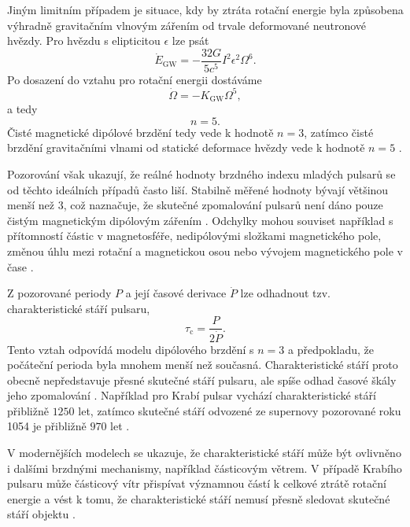 \documentclass[%
final%
,htext%
]{ipothes}
\begin{document}
Jiným limitním případem je situace, kdy by ztráta rotační energie byla způsobena výhradně gravitačním vlnovým zářením od trvale deformované neutronové hvězdy. Pro hvězdu s elipticitou $\epsilon$ lze psát
\begin{equation}
    \dot{E}_{\mathrm{GW}}
    =
    -
    \frac{32G}{5c^5}I^2\epsilon^2\Omega^6.
    \label{eq:gw_energy_loss}
\end{equation}
Po dosazení do vztahu pro rotační energii dostáváme
\begin{equation}
    \dot{\Omega}
    =
    -K_{\mathrm{GW}}\Omega^5,
    \label{eq:gw_spin_down}
\end{equation}
a tedy
\begin{equation}
    n = 5.
    \label{eq:braking_index_gw}
\end{equation}
Čisté magnetické dipólové brzdění tedy vede k hodnotě $n=3$, zatímco čisté brzdění gravitačními vlnami od statické deformace hvězdy vede k hodnotě $n=5$ \cite{araujo2016}.

Pozorování však ukazují, že reálné hodnoty brzdného indexu mladých pulsarů se od těchto ideálních případů často liší. Stabilně měřené hodnoty bývají většinou menší než $3$, což naznačuje, že skutečné zpomalování pulsarů není dáno pouze čistým magnetickým dipólovým zářením \cite{ghosh2007}. Odchylky mohou souviset například s přítomností částic v magnetosféře, nedipólovými složkami magnetického pole, změnou úhlu mezi rotační a magnetickou osou nebo vývojem magnetického pole v čase \cite{ghosh2007}.

Z pozorované periody $P$ a její časové derivace $\dot{P}$ lze odhadnout tzv. charakteristické stáří pulsaru,
\begin{equation}
    \tau_{\mathrm{c}}
    =
    \frac{P}{2\dot{P}}.
    \label{eq:characteristic_age}
\end{equation}
Tento vztah odpovídá modelu dipólového brzdění s $n=3$ a předpokladu, že počáteční perioda byla mnohem menší než současná. Charakteristické stáří proto obecně nepředstavuje přesné skutečné stáří pulsaru, ale spíše odhad časové škály jeho zpomalování \cite{ghosh2007}. Například pro Krabí pulsar vychází charakteristické stáří přibližně $1250$ let, zatímco skutečné stáří odvozené ze supernovy pozorované roku 1054 je přibližně $970$ let \cite{ghosh2007}.

V modernějších modelech se ukazuje, že charakteristické stáří může být ovlivněno i dalšími brzdnými mechanismy, například částicovým větrem. V případě Krabího pulsaru může částicový vítr přispívat významnou částí k celkové ztrátě rotační energie a vést k tomu, že charakteristické stáří nemusí přesně sledovat skutečné stáří objektu \cite{crab2022}.
\end{document}
